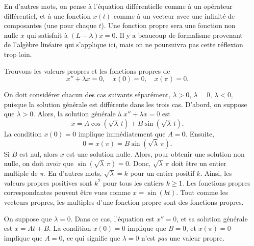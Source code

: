 En d'autres mots, on pense à l'équation différentielle comme à un opérateur différentiel, et à une fonction $x(t)$
comme à un vecteur avec une infinité de composantes (une pour chaque $t$).
Une fonction propre sera une fonction non nulle $x$ qui satisfait à 
$(L- \lambda)x = 0$. Il y a beaucoup de formalisme provenant de l'algèbre linéaire qui s'applique ici, mais on ne poursuivra pas cette réflexion trop loin.  

\begin{example} \label{bvp:eig1ex}
Trouvons les valeurs propres et les fonctions propres de 
\begin{equation*}
x'' + \lambda x = 0, \quad x(0) = 0, \quad x(\pi) = 0 .
\end{equation*}

On doit considérer chacun des cas suivants séparément, $\lambda > 0$, $\lambda = 0$, $\lambda < 0$, puisque la solution générale est différente dans les trois cas.
D'abord, on suppose que $\lambda > 0$.  Alors, la solution générale à $x''+\lambda x = 0$ est
\begin{equation*}
x = A \cos ( \sqrt{\lambda}\, t) + B \sin ( \sqrt{\lambda}\, t).
\end{equation*}
La condition $x(0) = 0$ implique immédiatement que $A = 0$.
Ensuite,
\begin{equation*}
0 = x(\pi) = B \sin ( \sqrt{\lambda}\, \pi ) .
\end{equation*}
Si $B$ est nul, alors $x$ est une solution nulle. Alors, pour obtenir une solution non nulle, on doit avoir que $\sin ( \sqrt{\lambda}\, \pi) = 0$.  Donc,
$\sqrt{\lambda}\, \pi$ doit être un entier multiple de $\pi$.  En d'autres mots,
 $\sqrt{\lambda} = k$ pour un entier positif $k$.
Ainsi, les valeurs propres positives sont 
$k^2$ pour tous les entiers $k \geq 1$.  Les fonctions propres correspondantes peuvent être vues comme $x=\sin (k t)$.  Tout comme les vecteurs propres, les multiples d'une fonction propre sont des fonctions propres. 

On suppose que $\lambda = 0$.  Dans ce cas, l'équation est $x'' = 0$,
et sa solution générale est $x = At + B$.  La condition  $x(0) = 0$ implique que 
 $B=0$, et $x(\pi) = 0$ implique que $A = 0$, ce qui signifie que $\lambda
= 0$ n'est \emph{pas} une valeur propre.


\end{example}
